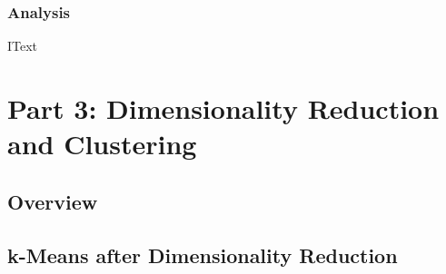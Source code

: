 \documentclass[h]{article}
\begin{document}
\subsubsection*{Analysis}
IText




\section*{Part 3: Dimensionality Reduction and Clustering}
\subsection*{Overview}

\subsection*{k-Means after Dimensionality Reduction}
\end{document}
